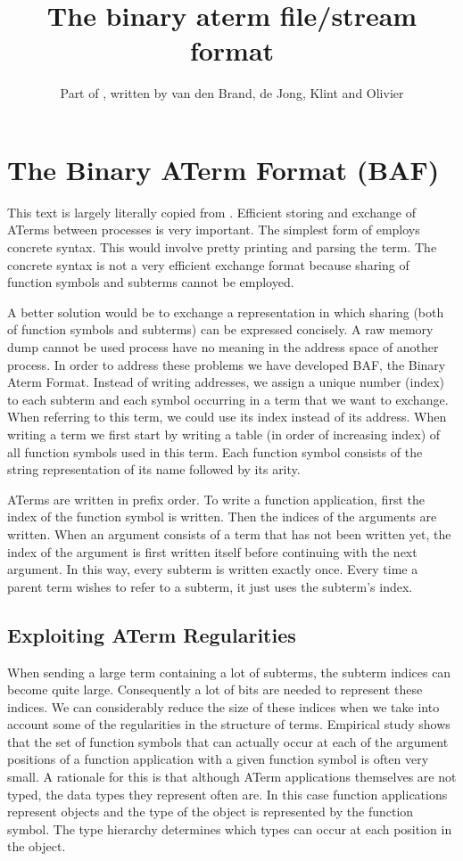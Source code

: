 \documentclass{article}
\title{The binary aterm file/stream format}
\author{Part of \cite{BJKO99}, written by van den Brand, de Jong, Klint and Olivier}
\date{}
\begin{document}
\maketitle
\section{The Binary ATerm Format (BAF)}
This text is largely literally copied from \cite{BJKO99}.
Efficient storing and exchange of ATerms between processes is very important.
The simplest form of employs concrete syntax.
This would involve pretty printing and parsing the term.
The concrete syntax is not a very efficient exchange format because sharing of function symbols and
subterms cannot be employed.

A better solution would be to exchange a representation in which sharing (both of function symbols and subterms)
can be expressed concisely.
A raw memory dump cannot be used  process have no meaning in the address space of another process.
In order to address these problems we have developed BAF, the Binary Aterm Format. Instead of writing addresses, we assign a unique number
(index) to each subterm and each symbol occurring in a term that we want to exchange.
When referring to this term, we could use its index instead of its address.
When writing a term  we first start by writing a table
(in order of increasing index) of all function symbols used in this term.
Each function symbol consists of the string representation of its name followed by its arity.

ATerms are written in prefix order. To write a function application, first the index of the function symbol
is written. Then the indices of the arguments are written. When an argument consists of a term that has not been
written yet, the index of the argument is first written itself before continuing with the next argument. In this way,
every subterm is written exactly once. Every time a parent term wishes to refer to a subterm, it just
uses the subterm's index.

\subsection{Exploiting ATerm Regularities}
When sending a large term containing a lot of subterms, the subterm indices can become quite large.
Consequently a lot of bits are needed to represent these indices.
We can considerably reduce the size of these indices when we take into account some of the regularities in the
structure of terms. Empirical study shows that the set of function symbols that can actually occur at each
of the argument positions of a function application with a given function symbol is often very small.
A rationale for this is that although ATerm applications themselves are not typed,
the data types they represent often are.
In this case  function applications represent objects and the type of the object is represented
by the function symbol. The type hierarchy determines which types can occur at each position in the object.
\end{document}
